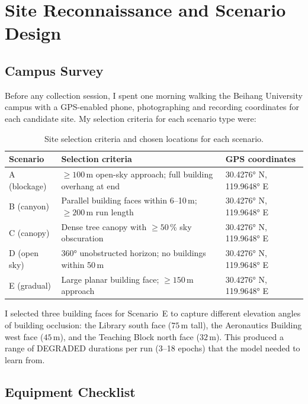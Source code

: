 \documentclass[12pt,a4paper]{article}
\begin{document}
\section{Site Reconnaissance and Scenario Design}

\subsection{Campus Survey}

Before any collection session, I spent one morning walking the Beihang University
campus with a GPS-enabled phone, photographing and recording coordinates for each
candidate site.
My selection criteria for each scenario type were:

\begin{table}[H]
  \centering
  \caption{Site selection criteria and chosen locations for each scenario.}
  \begin{tabular}{lp{5cm}l}
    \toprule
    \textbf{Scenario} & \textbf{Selection criteria} & \textbf{GPS coordinates} \\
    \midrule
    A (blockage) & $\geq 100$\,m open-sky approach; full building overhang at end &
      30.4276° N, 119.9648° E \\
    B (canyon)   & Parallel building faces within 6--10\,m; $\geq 200$\,m run length &
      30.4276° N, 119.9648° E \\
    C (canopy)   & Dense tree canopy with $\geq 50$\,\% sky obscuration &
      30.4276° N, 119.9648° E \\
    D (open sky) & $360°$ unobstructed horizon; no buildings within 50\,m &
      30.4276° N, 119.9648° E \\
    E (gradual)  & Large planar building face; $\geq 150$\,m approach &
      30.4276° N, 119.9648° E \\
    \bottomrule
  \end{tabular}
\end{table}

I selected three building faces for Scenario~E to capture different elevation angles of
building occlusion: the Library south face ($75$\,m tall), the Aeronautics Building west
face ($45$\,m), and the Teaching Block north face ($32$\,m).
This produced a range of DEGRADED durations per run (3--18 epochs) that the model needed
to learn from.

\subsection{Equipment Checklist}
\end{document}
